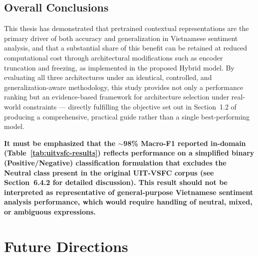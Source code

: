 \documentclass[12pt]{report} %
\begin{document}
\subsection{Overall Conclusions}
This thesis has demonstrated that pretrained contextual representations are the primary driver of both accuracy and generalization in Vietnamese sentiment analysis, and that a substantial share of this benefit can be retained at reduced computational cost through architectural modifications such as encoder truncation and freezing, as implemented in the proposed Hybrid model. By evaluating all three architectures under an identical, controlled, and generalization-aware methodology, this study provides not only a performance ranking but an evidence-based framework for architecture selection under real-world constraints --- directly fulfilling the objective set out in Section~1.2 of producing a comprehensive, practical guide rather than a single best-performing model.

\textbf{It must be emphasized that the $\sim$98\% Macro-F1 reported in-domain (Table~\ref{tab:uitvsfc-results}) reflects performance on a simplified binary (Positive/Negative) classification formulation that excludes the Neutral class present in the original UIT-VSFC corpus (see Section~6.4.2 for detailed discussion). This result should not be interpreted as representative of general-purpose Vietnamese sentiment analysis performance, which would require handling of neutral, mixed, or ambiguous expressions.}

\section{Future Directions}
\end{document}
